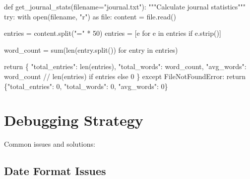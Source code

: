 \documentclass[
  letterpaper,
  DIV=11,
  numbers=noendperiod,
  oneside]{scrreprt}
\newenvironment{Shaded}{}{}
\newcommand{\BuiltInTok}[1]{\textcolor[rgb]{0.84,0.23,0.29}{#1}}
\newcommand{\CommentTok}[1]{\textcolor[rgb]{0.42,0.45,0.49}{#1}}
\newcommand{\ControlFlowTok}[1]{\textcolor[rgb]{0.84,0.23,0.29}{#1}}
\newcommand{\DecValTok}[1]{\textcolor[rgb]{0.00,0.36,0.77}{#1}}
\newcommand{\ImportTok}[1]{\textcolor[rgb]{0.01,0.18,0.38}{#1}}
\newcommand{\KeywordTok}[1]{\textcolor[rgb]{0.84,0.23,0.29}{#1}}
\newcommand{\NormalTok}[1]{\textcolor[rgb]{0.14,0.16,0.18}{#1}}
\newcommand{\OperatorTok}[1]{\textcolor[rgb]{0.14,0.16,0.18}{#1}}
\newcommand{\PreprocessorTok}[1]{\textcolor[rgb]{0.84,0.23,0.29}{#1}}
\newcommand{\StringTok}[1]{\textcolor[rgb]{0.01,0.18,0.38}{#1}}
\begin{document}
\begin{Shaded}
\begin{Highlighting}[]
\KeywordTok{def}\NormalTok{ get\_journal\_stats(filename}\OperatorTok{=}\StringTok{"journal.txt"}\NormalTok{):}
    \CommentTok{"""Calculate journal statistics"""}
    \ControlFlowTok{try}\NormalTok{:}
        \ControlFlowTok{with} \BuiltInTok{open}\NormalTok{(filename, }\StringTok{"r"}\NormalTok{) }\ImportTok{as} \BuiltInTok{file}\NormalTok{:}
\NormalTok{            content }\OperatorTok{=} \BuiltInTok{file}\NormalTok{.read()}
            
\NormalTok{        entries }\OperatorTok{=}\NormalTok{ content.split(}\StringTok{"="} \OperatorTok{*} \DecValTok{50}\NormalTok{)}
\NormalTok{        entries }\OperatorTok{=}\NormalTok{ [e }\ControlFlowTok{for}\NormalTok{ e }\KeywordTok{in}\NormalTok{ entries }\ControlFlowTok{if}\NormalTok{ e.strip()]}
        
\NormalTok{        word\_count }\OperatorTok{=} \BuiltInTok{sum}\NormalTok{(}\BuiltInTok{len}\NormalTok{(entry.split()) }\ControlFlowTok{for}\NormalTok{ entry }\KeywordTok{in}\NormalTok{ entries)}
        
        \ControlFlowTok{return}\NormalTok{ \{}
            \StringTok{"total\_entries"}\NormalTok{: }\BuiltInTok{len}\NormalTok{(entries),}
            \StringTok{"total\_words"}\NormalTok{: word\_count,}
            \StringTok{"avg\_words"}\NormalTok{: word\_count }\OperatorTok{//} \BuiltInTok{len}\NormalTok{(entries) }\ControlFlowTok{if}\NormalTok{ entries }\ControlFlowTok{else} \DecValTok{0}
\NormalTok{        \}}
    \ControlFlowTok{except} \PreprocessorTok{FileNotFoundError}\NormalTok{:}
        \ControlFlowTok{return}\NormalTok{ \{}\StringTok{"total\_entries"}\NormalTok{: }\DecValTok{0}\NormalTok{, }\StringTok{"total\_words"}\NormalTok{: }\DecValTok{0}\NormalTok{, }\StringTok{"avg\_words"}\NormalTok{: }\DecValTok{0}\NormalTok{\}}
\end{Highlighting}
\end{Shaded}

\section{Debugging Strategy}\label{debugging-strategy-6}

Common issues and solutions:

\subsection{Date Format Issues}\label{date-format-issues}
\end{document}
